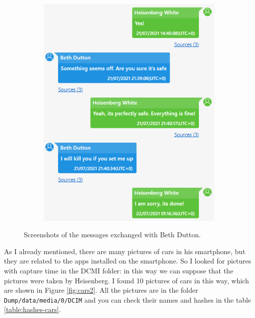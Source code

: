 \documentclass[12pt]{article}
\begin{document}
\begin{figure}[!ht]
\begin{subfigure}[b]{0.3\textwidth}
        \includegraphics[width=\textwidth]{images/beth2.png}
        \caption{}
    \end{subfigure}
    \caption{Screenshots of the messages exchanged with Beth Dutton.}
    \label{fig:messages2}
\end{figure}

As I already mentioned, there are many pictures of cars in his smartphone, but they are related to the apps installed on the smartphone. So I looked for pictures with capture time in the DCMI folder: in this way we can suppose that the pictures were taken by Heisenberg. I found 10 pictures of cars in this way, which are shown in Figure \ref{fig:cars2}. All the pictures are in the folder \texttt{Dump/data/media/0/DCIM} and you can check their names and hashes in the table \ref{table:hashes-cars}.
\end{document}
